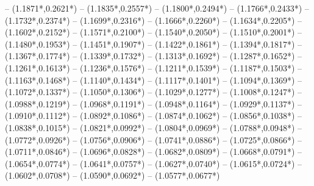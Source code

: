 {	-- ({1.1871*\dx},{0.2621*\dy})
	-- ({1.1835*\dx},{0.2557*\dy})
	-- ({1.1800*\dx},{0.2494*\dy})
	-- ({1.1766*\dx},{0.2433*\dy})
	-- ({1.1732*\dx},{0.2374*\dy})
	-- ({1.1699*\dx},{0.2316*\dy})
	-- ({1.1666*\dx},{0.2260*\dy})
	-- ({1.1634*\dx},{0.2205*\dy})
	-- ({1.1602*\dx},{0.2152*\dy})
	-- ({1.1571*\dx},{0.2100*\dy})
	-- ({1.1540*\dx},{0.2050*\dy})
	-- ({1.1510*\dx},{0.2001*\dy})
	-- ({1.1480*\dx},{0.1953*\dy})
	-- ({1.1451*\dx},{0.1907*\dy})
	-- ({1.1422*\dx},{0.1861*\dy})
	-- ({1.1394*\dx},{0.1817*\dy})
	-- ({1.1367*\dx},{0.1774*\dy})
	-- ({1.1339*\dx},{0.1732*\dy})
	-- ({1.1313*\dx},{0.1692*\dy})
	-- ({1.1287*\dx},{0.1652*\dy})
	-- ({1.1261*\dx},{0.1613*\dy})
	-- ({1.1236*\dx},{0.1576*\dy})
	-- ({1.1211*\dx},{0.1539*\dy})
	-- ({1.1187*\dx},{0.1503*\dy})
	-- ({1.1163*\dx},{0.1468*\dy})
	-- ({1.1140*\dx},{0.1434*\dy})
	-- ({1.1117*\dx},{0.1401*\dy})
	-- ({1.1094*\dx},{0.1369*\dy})
	-- ({1.1072*\dx},{0.1337*\dy})
	-- ({1.1050*\dx},{0.1306*\dy})
	-- ({1.1029*\dx},{0.1277*\dy})
	-- ({1.1008*\dx},{0.1247*\dy})
	-- ({1.0988*\dx},{0.1219*\dy})
	-- ({1.0968*\dx},{0.1191*\dy})
	-- ({1.0948*\dx},{0.1164*\dy})
	-- ({1.0929*\dx},{0.1137*\dy})
	-- ({1.0910*\dx},{0.1112*\dy})
	-- ({1.0892*\dx},{0.1086*\dy})
	-- ({1.0874*\dx},{0.1062*\dy})
	-- ({1.0856*\dx},{0.1038*\dy})
	-- ({1.0838*\dx},{0.1015*\dy})
	-- ({1.0821*\dx},{0.0992*\dy})
	-- ({1.0804*\dx},{0.0969*\dy})
	-- ({1.0788*\dx},{0.0948*\dy})
	-- ({1.0772*\dx},{0.0926*\dy})
	-- ({1.0756*\dx},{0.0906*\dy})
	-- ({1.0741*\dx},{0.0886*\dy})
	-- ({1.0725*\dx},{0.0866*\dy})
	-- ({1.0711*\dx},{0.0846*\dy})
	-- ({1.0696*\dx},{0.0828*\dy})
	-- ({1.0682*\dx},{0.0809*\dy})
	-- ({1.0668*\dx},{0.0791*\dy})
	-- ({1.0654*\dx},{0.0774*\dy})
	-- ({1.0641*\dx},{0.0757*\dy})
	-- ({1.0627*\dx},{0.0740*\dy})
	-- ({1.0615*\dx},{0.0724*\dy})
	-- ({1.0602*\dx},{0.0708*\dy})
	-- ({1.0590*\dx},{0.0692*\dy})
	-- ({1.0577*\dx},{0.0677*\dy})
}
